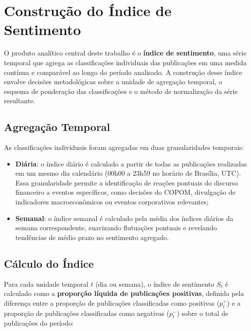 
\section{Construção do Índice de Sentimento}
\label{sec:indice_sentimento}

O produto analítico central deste trabalho é o \textbf{índice de sentimento}, uma série temporal que agrega as classificações individuais das publicações em uma medida contínua e comparável ao longo do período analisado. A construção desse índice envolve decisões metodológicas sobre a unidade de agregação temporal, o esquema de ponderação das classificações e o método de normalização da série resultante.

\subsection{Agregação Temporal}
\label{subsec:agregacao_temporal}

As classificações individuais foram agregadas em duas granularidades temporais:

\begin{itemize}
    \item \textbf{Diária}: o índice diário é calculado a partir de todas as publicações realizadas em um mesmo dia calendário (00h00 a 23h59 no horário de Brasília, UTC). Essa granularidade permite a
    identificação de reações pontuais do discurso financeiro a eventos específicos, como decisões do COPOM, divulgação de indicadores macroeconômicos ou eventos corporativos relevantes;
    
    \item \textbf{Semanal}: o índice semanal é calculado pela média dos índices diários da semana correspondente, suavizando flutuações pontuais e revelando tendências de médio prazo no sentimento agregado.
\end{itemize}

\subsection{Cálculo do Índice}
\label{subsec:calculo_indice}

Para cada unidade temporal $t$ (dia ou semana), o índice de sentimento $S_t$ é calculado como a \textbf{proporção líquida de publicações positivas}, definida pela diferença entre a proporção de publicações classificadas como positivas ($p_t^+$) e a proporção de publicações classificadas como negativas ($p_t^-$) sobre o total de publicações do período:

